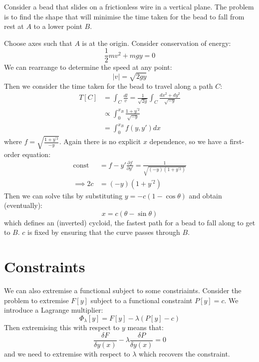 \documentclass[../Main.tex]{subfiles}
\begin{document}
\begin{example}
    Consider a bead that slides on a frictionless wire in a vertical plane. The problem is to find the shape that will minimise the time taken for the bead to fall from rest at $A$ to a lower point $B$.

    Choose axes such that $A$ is at the origin. Consider conservation of energy:
    \begin{equation*}
        \frac{1}{2} mv^2 + mgy = 0
    \end{equation*}
    We can rearrange to determine the speed at any point:
    \begin{equation*}
        |v| = \sqrt{2gy}
    \end{equation*}
    Then we consider the time taken for the bead to travel along a path $C$:
    \begin{align*}
        T[C] &= \int_C \frac{dl}{v} = \frac{1}{\sqrt{2g}} \int_C \frac{dx^2 + dy^2}{\sqrt{-y}} \\
        &\propto \int_0^{x_B} \frac{1 + y^{\prime 2}}{\sqrt{-y}} \\
        &= \int_0^{x_B} f(y, y') dx
    \end{align*}
    where $f = \sqrt{\frac{1 + y^{\prime 2}}{-y}}$. Again there is no explicit $x$ dependence, so we have a first-order equation:
    \begin{align*}
        \text{const } &= f - y' \frac{\partial f}{\partial y'} = \frac{1}{\sqrt{(-y)(1 + y^{\prime 2})}} \\
        \implies 2c &= (-y)(1 + y^{\prime 2})
    \end{align*}
    Then we can solve tihs by substituting $y = -c(1 - \cos{\theta})$ and obtain (eventually):
    \begin{equation*}
        x = c(\theta - \sin{\theta})
    \end{equation*}
    which defines an (inverted) cycloid, the fastest path for a bead to fall along to get to $B$. $c$ is fixed by ensuring that the curve passes through $B$.
\end{example}
\section{Constraints}
We can also extremise a functional subject to some constriaints. Consider the problem to extremise $F[y]$ subject to a functional constraint $P[y] = c$. We introduce a Lagrange multiplier:
\begin{equation*}
    \Phi_\lambda[y] = F[y] - \lambda (P[y] - c)
\end{equation*}
Then extremising this with respect to $y$ means that:
\begin{equation}
    \frac{\delta F}{\delta y(x)} - \lambda \frac{\delta P}{\delta y(x)} = 0
    \label{eqnEulerLagrangeConstraint}
\end{equation}
and we need to extremise with respect to $\lambda$ which recovers the constraint.
\end{document}
